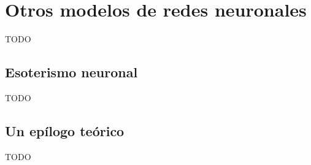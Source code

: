 \section{Otros modelos de redes neuronales}

TODO


\subsection{Esoterismo neuronal}

TODO


\subsection{Un epílogo teórico}

TODO
